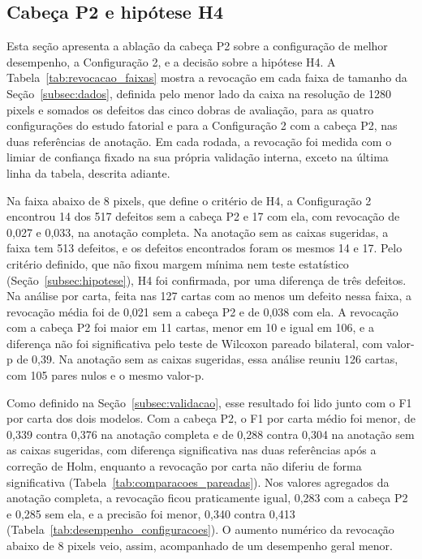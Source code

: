 \documentclass[
    12pt,                %
    openright,           %
    oneside,             %
    a4paper,             %
    english,             %
    brazil               %
]{abntex2}
\begin{document}
\subsection{Cabeça P2 e hipótese H4}
\label{subsec:res_p2}

Esta seção apresenta a ablação da cabeça P2 sobre a configuração de
melhor desempenho, a Configuração 2, e a decisão sobre a hipótese H4. A
Tabela~\ref{tab:revocacao_faixas} mostra a revocação em cada faixa de
tamanho da Seção~\ref{subsec:dados}, definida pelo menor lado da caixa na
resolução de 1280 pixels e somados os defeitos das cinco dobras de
avaliação, para as quatro configurações do estudo fatorial e para a
Configuração 2 com a cabeça P2, nas duas referências de anotação. Em cada
rodada, a revocação foi medida com o limiar de confiança fixado na sua
própria validação interna, exceto na última linha da tabela, descrita
adiante.

Na faixa abaixo de 8 pixels, que define o critério de H4, a
Configuração 2 encontrou 14 dos 517 defeitos sem a cabeça P2 e 17 com ela,
com revocação de 0,027 e 0,033, na anotação completa. Na anotação sem as
caixas sugeridas, a faixa tem 513 defeitos, e os defeitos encontrados
foram os mesmos 14 e 17. Pelo critério definido, que não fixou margem
mínima nem teste estatístico (Seção~\ref{subsec:hipotese}), H4 foi
confirmada, por uma diferença de três defeitos. Na análise por carta,
feita nas 127 cartas com ao menos um defeito nessa faixa, a revocação
média foi de 0,021 sem a cabeça P2 e de 0,038 com ela. A revocação com a
cabeça P2 foi maior em 11 cartas, menor em 10 e igual em 106, e a
diferença não foi significativa pelo teste de Wilcoxon pareado bilateral,
com valor-p de 0,39. Na anotação sem as caixas sugeridas, essa análise
reuniu 126 cartas, com 105 pares nulos e o mesmo valor-p.

Como definido na Seção~\ref{subsec:validacao}, esse resultado foi lido
junto com o F1 por carta dos dois modelos. Com a cabeça P2, o F1 por
carta médio foi menor, de 0,339 contra 0,376 na anotação completa e de
0,288 contra 0,304 na anotação sem as caixas sugeridas, com diferença
significativa nas duas referências após a correção de Holm, enquanto a
revocação por carta não diferiu de forma significativa
(Tabela~\ref{tab:comparacoes_pareadas}). Nos valores agregados da anotação
completa, a revocação ficou praticamente igual, 0,283 com a cabeça P2 e
0,285 sem ela, e a precisão foi menor, 0,340 contra 0,413
(Tabela~\ref{tab:desempenho_configuracoes}). O aumento numérico da
revocação abaixo de 8 pixels veio, assim, acompanhado de um desempenho
geral menor.
\end{document}
